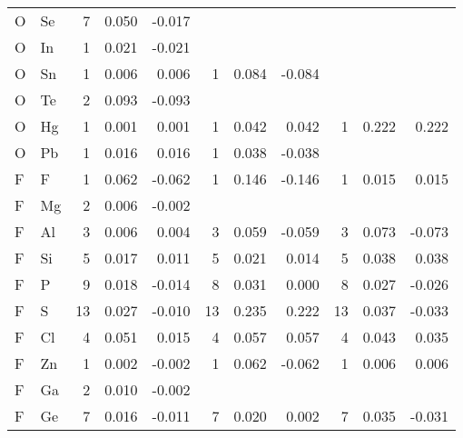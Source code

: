 \begin{table}
\begin{center}
\begin{tabular}{llrrrrrrrrr}
  O &  Se &   7 &    0.050 &   -0.017 &     &          &          &     &          &          \\
  O &  In &   1 &    0.021 &   -0.021 &     &          &          &     &          &          \\
  O &  Sn &   1 &    0.006 &    0.006 &   1 &    0.084 &   -0.084 &     &          &          \\
  O &  Te &   2 &    0.093 &   -0.093 &     &          &          &     &          &          \\
  O &  Hg &   1 &    0.001 &    0.001 &   1 &    0.042 &    0.042 &   1 &    0.222 &    0.222 \\
  O &  Pb &   1 &    0.016 &    0.016 &   1 &    0.038 &   -0.038 &     &          &          \\
  F &   F &   1 &    0.062 &   -0.062 &   1 &    0.146 &   -0.146 &   1 &    0.015 &    0.015 \\
  F &  Mg &   2 &    0.006 &   -0.002 &     &          &          &     &          &          \\
  F &  Al &   3 &    0.006 &    0.004 &   3 &    0.059 &   -0.059 &   3 &    0.073 &   -0.073 \\
  F &  Si &   5 &    0.017 &    0.011 &   5 &    0.021 &    0.014 &   5 &    0.038 &    0.038 \\
  F &   P &   9 &    0.018 &   -0.014 &   8 &    0.031 &    0.000 &   8 &    0.027 &   -0.026 \\
  F &   S &  13 &    0.027 &   -0.010 &  13 &    0.235 &    0.222 &  13 &    0.037 &   -0.033 \\
  F &  Cl &   4 &    0.051 &    0.015 &   4 &    0.057 &    0.057 &   4 &    0.043 &    0.035 \\
  F &  Zn &   1 &    0.002 &   -0.002 &   1 &    0.062 &   -0.062 &   1 &    0.006 &    0.006 \\
  F &  Ga &   2 &    0.010 &   -0.002 &     &          &          &     &          &          \\
  F &  Ge &   7 &    0.016 &   -0.011 &   7 &    0.020 &    0.002 &   7 &    0.035 &   -0.031 \\
\hline
\end{tabular}
\end{center}
\end{table}

